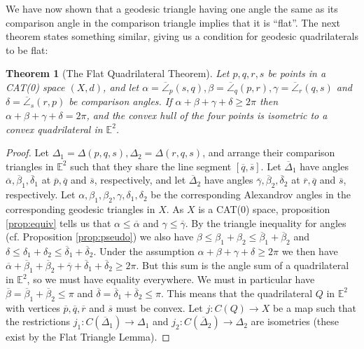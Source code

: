 \documentclass[11pt, a4paper, oneside]{memoir}
\theoremstyle{plain}\newtheorem{theorem}[subsection]{Theorem}
\theoremstyle{definition}
\newcommand{\E}{\mathbb{E}}
\begin{document}
We have now shown that a geodesic triangle having one angle the same as its comparison angle in the comparison triangle implies that it is ``flat''.
The next theorem states something similar, giving us a condition for geodesic quadrilaterals to be flat:
\begin{theorem}[The Flat Quadrilateral Theorem]\label{thm:flat_quad}
    Let \(p,q,r,s\) be points in a CAT(0) space \((X,d)\), and let \(\alpha=\overline{\angle}_p(s,q),\beta=\overline{\angle}_q(p,r),\gamma=\overline{\angle}_r(q,s)\) and \(\delta=\overline{\angle}_s(r,p)\) be comparison angles.
    If \(\alpha+\beta+\gamma+\delta\geq 2\pi\) then \(\alpha+\beta+\gamma+\delta= 2\pi\), and the convex hull of the four points is isometric to a convex quadrilateral in \(\E^2\).    
\end{theorem}
\begin{proof}
Let \(\Delta_1=\Delta(p,q,s),\Delta_2=\Delta(r,q,s)\), and arrange their comparison triangles in \(\E^2\) such that they share the line segment \([\overline{q},\overline{s}]\).
Let \(\overline{\Delta}_1\) have angles \(\overline{\alpha},\overline{\beta}_1,\overline{\delta}_1\) at \(\overline{p},\overline{q}\) and \(\overline{s}\), respectively, and let \(\overline{\Delta}_2\) have angles \(\overline{\gamma},\overline{\beta}_2,\overline{\delta}_2\) at \(\overline{r},\overline{q}\) and \(\overline{s}\), respectively.
Let \(\alpha,\beta_1,\beta_2,\gamma,\delta_1,\delta_2\) be the corresponding Alexandrov angles in the corresponding geodesic triangles in \(X\).
As \(X\) is a CAT(0) space, proposition \ref{prop:equiv} tells us that \(\alpha\leq\overline{\alpha}\) and \(\gamma\leq\overline{\gamma}\).
By the triangle inequality for angles (cf. Proposition \ref{prop:pseudo}) we also have \(\beta\leq\beta_1+\beta_2\leq\overline{\beta}_1+\overline{\beta}_2\) and \(\delta\leq \delta_1+\delta_2\leq\overline{\delta}_1+\overline{\delta}_2\).
Under the assumption \(\alpha+\beta+\gamma+\delta\geq2\pi\) we then have \(\overline{\alpha}+\overline{\beta}_1+\overline{\beta}_2+\overline{\gamma}+\overline{\delta}_1+\overline{\delta}_2\geq 2\pi\).
But this sum is the angle sum of a quadrilateral in \(\E^2\), so we must have equality everywhere.
We must in particular have \(\overline{\beta}=\overline{\beta}_1+\overline{\beta}_2\leq\pi\) and \(\overline{\delta}=\overline{\delta}_1+\overline{\delta}_2\leq\pi\).
This means that the quadrilateral \(Q\) in \(\E^2\) with vertices \(\overline{p},\overline{q},\overline{r}\) and \(\overline{s}\) must be convex.
Let \(j:C(Q)\to X\) be a map such that the restrictions \(j_1:C(\overline{\Delta}_1)\to\Delta_1\) and \(j_2:C(\overline{\Delta}_2)\to\Delta_2\) are isometries (these exist by the Flat Triangle Lemma).

\end{proof}
\end{document}
